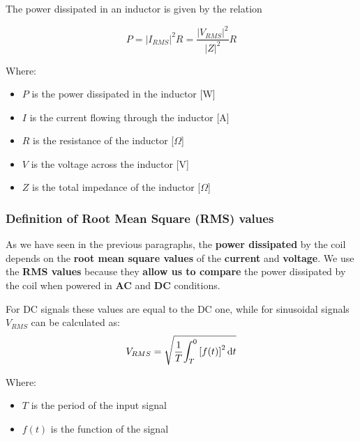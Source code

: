 \begin{samepage}
    The power dissipated in an inductor is given by the relation
    \nopagebreak

    \begin{equation}
        P = |I_{RMS}|^2R = \frac{|V_{RMS}|^2}{|Z|^2}R
        \label{eq: Joule_heating}
    \end{equation}
    \nopagebreak

    Where:
    \begin{itemize}
        \item \( P \) is the power dissipated in the inductor [W]
        \item \( I \) is the current flowing through the inductor [A]
        \item \( R \) is the resistance of the inductor [\(\Omega\)]
        \item \( V \) is the voltage across the inductor [V]
        \item \( Z \) is the total impedance of the inductor [\(\Omega\)]
    \end{itemize}
\end{samepage}

\subsubsection{Definition of Root Mean Square (RMS) values}
As we have seen in the previous paragraphs, the \textbf{power dissipated} by the coil depends on the \textbf{root mean square values} of the \textbf{current} and \textbf{voltage}.
We use the \textbf{RMS values} because they \textbf{allow us to compare} the power dissipated by the coil when powered in \textbf{AC} and \textbf{DC} conditions.

\begin{samepage}
    For DC signals these values are equal to the DC one, while for sinusoidal signals $V_{RMS}$ can be calculated as:
    \begin{equation}
        V_{RMS} = \sqrt{\frac{1}{T} {\int_{T}^{0} {[f(t)]}^2\, {\rm d}t}}
    \end{equation}
    \nopagebreak

    Where:
    \begin{itemize}
        \item \(T\) is the period of the input signal
        \item \(f(t)\) is the function of the signal 
    \end{itemize}
    \hfill
\end{samepage}

